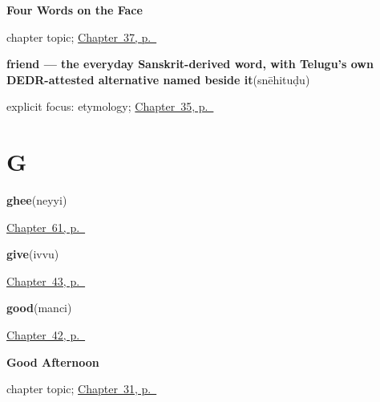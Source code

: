 \noindent\begin{minipage}[t]{\linewidth}
\raggedright
\textbf{Four Words on the Face}\par
\footnotesize chapter topic; \hyperref[ch:te-face-words]{Chapter~37, p.~\pageref*{ch:te-face-words}}
\end{minipage}\par\smallskip

\noindent\begin{minipage}[t]{\linewidth}
\raggedright
\textbf{friend — the everyday Sanskrit-derived word, with Telugu's own DEDR-attested alternative named beside it}\enspace\emph{}\enspace(snēhituḍu)\par
\footnotesize explicit focus: etymology; \hyperref[ch:te-family-and-friends]{Chapter~35, p.~\pageref*{ch:te-family-and-friends}}
\end{minipage}\par\smallskip

\section*{G}

\noindent\begin{minipage}[t]{\linewidth}
\raggedright
\textbf{ghee}\enspace\emph{}\enspace(neyyi)\par
\footnotesize \hyperref[ch:te-kitchen]{Chapter~61, p.~\pageref*{ch:te-kitchen}}
\end{minipage}\par\smallskip

\noindent\begin{minipage}[t]{\linewidth}
\raggedright
\textbf{give}\enspace\emph{}\enspace(ivvu)\par
\footnotesize \hyperref[ch:te-more-verbs]{Chapter~43, p.~\pageref*{ch:te-more-verbs}}
\end{minipage}\par\smallskip

\noindent\begin{minipage}[t]{\linewidth}
\raggedright
\textbf{good}\enspace\emph{}\enspace(manci)\par
\footnotesize \hyperref[ch:te-describing-things]{Chapter~42, p.~\pageref*{ch:te-describing-things}}
\end{minipage}\par\smallskip

\noindent\begin{minipage}[t]{\linewidth}
\raggedright
\textbf{Good Afternoon}\par
\footnotesize chapter topic; \hyperref[ch:te-good-afternoon]{Chapter~31, p.~\pageref*{ch:te-good-afternoon}}
\end{minipage}\par\smallskip

